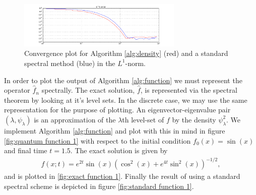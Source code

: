 \documentclass[final,leqno]{siamltex1213}
\begin{document}
\begin{figure}
	\centering
	\includegraphics[width=0.7\textwidth]{./images/convergence_plot.pdf}
	\caption{Convergence plot for Algorithm \ref{alg:density} (red) and a standard spectral method (blue) in the $L^{1}$-norm.}
	\label{fig:convergence}
\end{figure}

%


In order to plot the output of Algorithm \ref{alg:function} we must represent the operator $\hat{f}_{n}$ spectrally.
The exact solution, $\hat{f}$, is represented via the spectral theorem by looking at it's level sets.
In the discrete case, we may use the same representation for the purpose of plotting.
An eigenvector-eigenvalue pair $(\lambda , \psi_{\lambda})$ is an approximation of the $\lambda$th level-set of $f$ by the density $\psi_{\lambda}^{2}$.
We implement Algorithm \ref{alg:function} and plot with this in mind in figure \ref{fig:quantum function 1}
with respect to the initial condition $f_{0}(x) = \sin(x)$ and final time $t=1.5$.
The exact solution is given by 
\begin{align}
	f(x;t) = e^{2t} \sin(x) \left( \cos^{2}(x) + e^{4t} \sin^{2}(x) \right)^{-1/2},
\end{align}
and is plotted in \ref{fig:exact function 1}.
Finally the result of using a standard spectral scheme is depicted in figure \ref{fig:standard function 1}.
\end{document}
